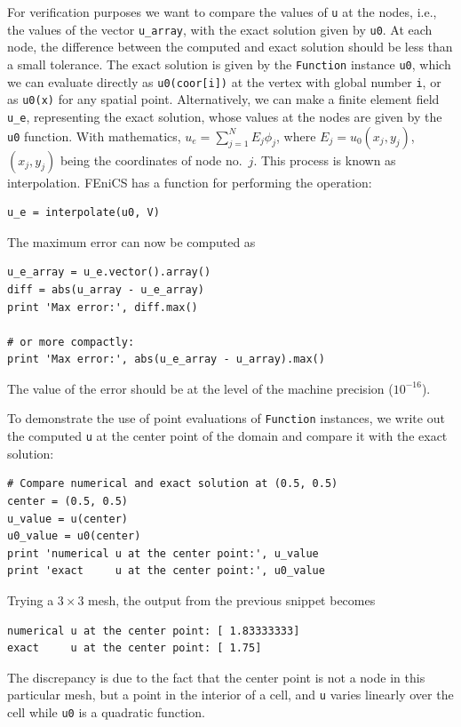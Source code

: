 For verification purposes we want to compare the values of {\fontsize{12pt}{12pt}\verb!u!}
at the nodes, i.e., the values of the vector {\fontsize{12pt}{12pt}\verb!u_array!}, with
the exact solution given by {\fontsize{12pt}{12pt}\verb!u0!}. At each node, the difference
between the computed and exact solution should be less than a
small tolerance. The exact solution is given by the {\fontsize{12pt}{12pt}\texttt{Function}}
instance {\fontsize{12pt}{12pt}\texttt{u0}}, which we can evaluate directly as
{\fontsize{12pt}{12pt}\texttt{u0(coor[i])}} at the vertex with global number {\fontsize{12pt}{12pt}\texttt{i}}, or as
{\fontsize{12pt}{12pt}\texttt{u0(x)}} for any spatial point.
Alternatively, we can make a finite element field {\fontsize{12pt}{12pt}\verb!u_e!}, representing
the exact solution, whose values at the nodes are given by the
{\fontsize{12pt}{12pt}\texttt{u0}} function. With mathematics, $u_e = \sum_{j=1}^N  E_j\phi_j$, where
$E_j=u_0(x_j,y_j)$, $(x_j,y_j)$ being the coordinates of node no.~$j$.
This process is known as interpolation.
FEniCS has a function for performing the operation:
\begin{Verbatim}[fontsize=\fontsize{10pt}{10pt},tabsize=8,baselinestretch=1.05,
fontfamily=tt,xleftmargin=7mm]
u_e = interpolate(u0, V)
\end{Verbatim}
\noindent
The maximum error can now be computed as
\begin{Verbatim}[fontsize=\fontsize{10pt}{10pt},tabsize=8,baselinestretch=1.05,
fontfamily=tt,xleftmargin=7mm]
u_e_array = u_e.vector().array()
diff = abs(u_array - u_e_array)
print 'Max error:', diff.max()

# or more compactly:
print 'Max error:', abs(u_e_array - u_array).max()
\end{Verbatim}
\noindent
The value of the error should be at the level of the machine precision
($10^{-16}$).

To demonstrate the use of point evaluations of {\fontsize{12pt}{12pt}\verb!Function!} instances,
we write out the computed {\fontsize{12pt}{12pt}\verb!u!} at the center point
of the domain and compare it with the exact solution:
\begin{Verbatim}[fontsize=\fontsize{10pt}{10pt},tabsize=8,baselinestretch=1.05,
fontfamily=tt,xleftmargin=7mm]
# Compare numerical and exact solution at (0.5, 0.5)
center = (0.5, 0.5)
u_value = u(center)
u0_value = u0(center)
print 'numerical u at the center point:', u_value
print 'exact     u at the center point:', u0_value
\end{Verbatim}
\noindent
Trying a $3\times 3$ mesh, the output from the
previous snippet becomes
\begin{Verbatim}[fontsize=\fontsize{10pt}{10pt},tabsize=8,baselinestretch=1.05,
fontfamily=tt,xleftmargin=7mm]
numerical u at the center point: [ 1.83333333]
exact     u at the center point: [ 1.75]
\end{Verbatim}
\noindent
The discrepancy is due to the fact that the center point is not a node
in this particular mesh, but a point in the interior of a cell,
and {\fontsize{12pt}{12pt}\verb!u!} varies linearly over the cell while
{\fontsize{12pt}{12pt}\verb!u0!} is a quadratic function.

